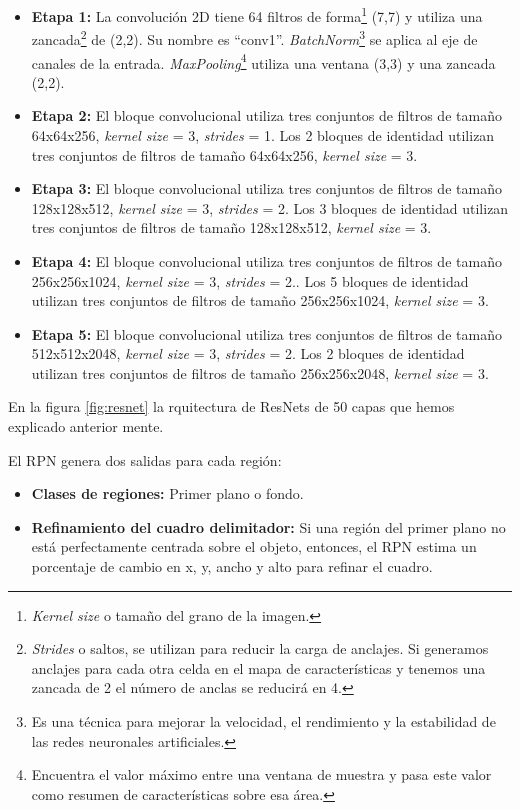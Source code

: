 \begin{itemize}
    \item \textbf{Etapa 1:} La convolución 2D tiene 64 filtros de forma\footnote{\textit{Kernel size} o tamaño del grano de la imagen.} (7,7) y utiliza una zancada\footnote{\textit{Strides} o saltos, se utilizan para reducir la carga de anclajes. Si generamos anclajes para cada otra celda en el mapa de características y tenemos una zancada de 2 el número de anclas se reducirá en 4.} de (2,2). Su nombre es ``conv1''. \textit{BatchNorm}\footnote{Es una técnica para mejorar la velocidad, el rendimiento y la estabilidad de las redes neuronales artificiales.} se aplica al eje de canales de la entrada. \textit{MaxPooling}\footnote{Encuentra el valor máximo entre una ventana de muestra y pasa este valor como resumen de características sobre esa área.} utiliza una ventana (3,3) y una zancada (2,2).
    \item \textbf{Etapa 2:} El bloque convolucional utiliza tres conjuntos de filtros de tamaño 64x64x256, \textit{kernel size} = 3, \textit{strides} = 1. Los 2 bloques de identidad utilizan tres conjuntos de filtros de tamaño 64x64x256, \textit{kernel size} = 3.
    \item \textbf{Etapa 3:} El bloque convolucional utiliza tres conjuntos de filtros de tamaño 128x128x512, \textit{kernel size} = 3, \textit{strides} = 2. Los 3 bloques de identidad utilizan tres conjuntos de filtros de tamaño 128x128x512, \textit{kernel size} = 3.
    \item \textbf{Etapa 4:} El bloque convolucional utiliza tres conjuntos de filtros de tamaño 256x256x1024, \textit{kernel size} = 3, \textit{strides} = 2.. Los 5 bloques de identidad utilizan tres conjuntos de filtros de tamaño 256x256x1024, \textit{kernel size} = 3.
    \item \textbf{Etapa 5:} El bloque convolucional utiliza tres conjuntos de filtros de tamaño 512x512x2048, \textit{kernel size} = 3, \textit{strides} = 2. Los 2 bloques de identidad utilizan tres conjuntos de filtros de tamaño 256x256x2048, \textit{kernel size} = 3.
\end{itemize}


En la figura \ref{fig:resnet} la rquitectura de ResNets de 50 capas que hemos explicado anterior mente.

El RPN genera dos salidas para cada región:

\begin{itemize}
    \item \textbf{Clases de regiones:} Primer plano o fondo.
    \item \textbf{Refinamiento del cuadro delimitador:} Si una región del primer plano no está perfectamente centrada sobre el objeto, entonces, el RPN estima un porcentaje de cambio en x, y, ancho y alto para refinar el cuadro.
\end{itemize}

